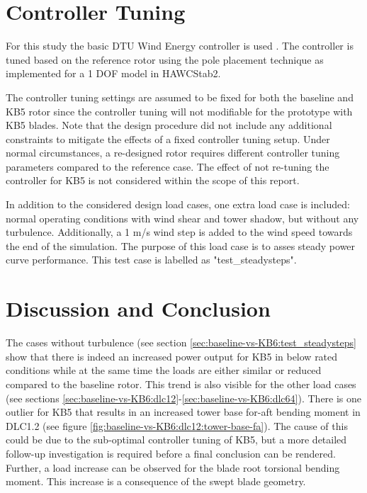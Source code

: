 \section{Controller Tuning}
\label{sec:dlb:Controller Tuning}

For this study the basic DTU Wind Energy controller is used \cite{hansen_basic_2013}. The controller is tuned based on the reference rotor using the pole placement technique as implemented for a 1 DOF model in HAWCStab2.

The controller tuning settings are assumed to be fixed for both the baseline and KB5 rotor since the controller tuning will not modifiable for the prototype with KB5 blades. Note that the design procedure did not include any additional constraints to mitigate the effects of a fixed controller tuning setup. Under normal circumstances, a re-designed rotor requires different controller tuning parameters compared to the reference case. The effect of not re-tuning the controller for KB5 is not considered within the scope of this report.

In addition to the considered design load cases, one extra load case is included: normal operating conditions with wind shear and tower shadow, but without any turbulence. Additionally, a 1 m/s wind step is added to the wind speed towards the end of the simulation. The purpose of this load case is to asses steady power curve performance. This test case is labelled as "test\_steadysteps".


\section{Discussion and Conclusion}
\label{sec:dlb:discussion}

The cases without turbulence (see section \ref{sec:baseline-vs-KB6:test_steadysteps} show that there is indeed an increased power output for KB5 in below rated conditions while at the same time the loads are either similar or reduced compared to the baseline rotor. This trend is also visible for the other load cases (see sections \ref{sec:baseline-vs-KB6:dlc12}-\ref{sec:baseline-vs-KB6:dlc64}). There is one outlier for KB5 that results in an increased tower base for-aft bending moment in DLC1.2 (see figure \ref{fig:baseline-vs-KB6:dlc12:tower-base-fa}). The cause of this could be due to the sub-optimal controller tuning of KB5, but a more detailed follow-up investigation is required before a final conclusion can be rendered. Further, a load increase can be observed for the blade root torsional bending moment. This increase is a consequence of the swept blade geometry.


